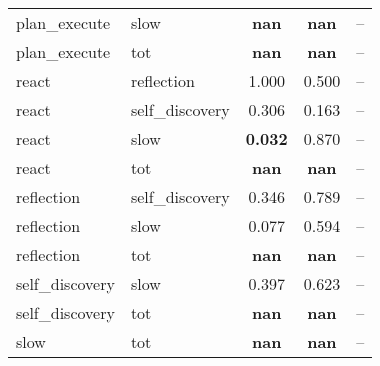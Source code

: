 \begin{table}[htbp]
\begin{tabular}{llccc}
plan_execute & slow & \textbf{nan} & \textbf{nan} & -- \\
plan_execute & tot & \textbf{nan} & \textbf{nan} & -- \\
react & reflection & 1.000 & 0.500 & -- \\
react & self_discovery & 0.306 & 0.163 & -- \\
react & slow & \textbf{0.032} & 0.870 & -- \\
react & tot & \textbf{nan} & \textbf{nan} & -- \\
reflection & self_discovery & 0.346 & 0.789 & -- \\
reflection & slow & 0.077 & 0.594 & -- \\
reflection & tot & \textbf{nan} & \textbf{nan} & -- \\
self_discovery & slow & 0.397 & 0.623 & -- \\
self_discovery & tot & \textbf{nan} & \textbf{nan} & -- \\
slow & tot & \textbf{nan} & \textbf{nan} & -- \\
\bottomrule
\end{tabular}
\end{table}
